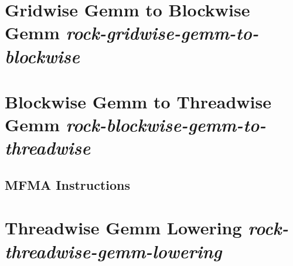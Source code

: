\section{Gridwise Gemm to Blockwise Gemm \emph{rock-gridwise-gemm-to-blockwise}}

\section{Blockwise Gemm to Threadwise Gemm \emph{rock-blockwise-gemm-to-threadwise}}

\subsection{MFMA Instructions}

\section{Threadwise Gemm Lowering \emph{rock-threadwise-gemm-lowering}}



